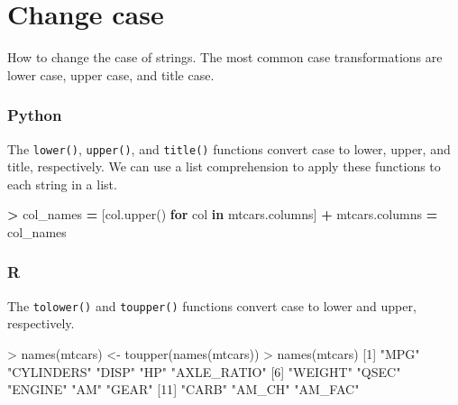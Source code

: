 \documentclass[
]{book}
\newenvironment{Shaded}{\begin{snugshade}}{\end{snugshade}}
\newcommand{\ControlFlowTok}[1]{\textcolor[rgb]{0.13,0.29,0.53}{\textbf{#1}}}
\newcommand{\DecValTok}[1]{\textcolor[rgb]{0.00,0.00,0.81}{#1}}
\newcommand{\FunctionTok}[1]{\textcolor[rgb]{0.00,0.00,0.00}{#1}}
\newcommand{\KeywordTok}[1]{\textcolor[rgb]{0.13,0.29,0.53}{\textbf{#1}}}
\newcommand{\NormalTok}[1]{#1}
\newcommand{\OperatorTok}[1]{\textcolor[rgb]{0.81,0.36,0.00}{\textbf{#1}}}
\newcommand{\OtherTok}[1]{\textcolor[rgb]{0.56,0.35,0.01}{#1}}
\newcommand{\SpecialCharTok}[1]{\textcolor[rgb]{0.00,0.00,0.00}{#1}}
\newcommand{\StringTok}[1]{\textcolor[rgb]{0.31,0.60,0.02}{#1}}
\begin{document}
\hypertarget{change-case}{%
\section{Change case}\label{change-case}}

How to change the case of strings. The most common case transformations are lower case, upper case, and title case.

\hypertarget{python-26}{%
\subsubsection*{Python}\label{python-26}}

The \texttt{lower()}, \texttt{upper()}, and \texttt{title()} functions convert case to lower, upper, and title, respectively. We can use a list comprehension to apply these functions to each string in a list.

\begin{Shaded}
\begin{Highlighting}[]
\OperatorTok{\textgreater{}}\NormalTok{ col\_names }\OperatorTok{=}\NormalTok{ [col.upper() }\ControlFlowTok{for}\NormalTok{ col }\KeywordTok{in}\NormalTok{ mtcars.columns]}
\OperatorTok{+}\NormalTok{ mtcars.columns }\OperatorTok{=}\NormalTok{ col\_names}
\end{Highlighting}
\end{Shaded}

\hypertarget{r-26}{%
\subsubsection*{R}\label{r-26}}

The \texttt{tolower()} and \texttt{toupper()} functions convert case to lower and upper, respectively.

\begin{Shaded}
\begin{Highlighting}[]
\SpecialCharTok{\textgreater{}} \FunctionTok{names}\NormalTok{(mtcars) }\OtherTok{\textless{}{-}} \FunctionTok{toupper}\NormalTok{(}\FunctionTok{names}\NormalTok{(mtcars))}
\SpecialCharTok{\textgreater{}} \FunctionTok{names}\NormalTok{(mtcars)}
\NormalTok{ [}\DecValTok{1}\NormalTok{] }\StringTok{"MPG"}        \StringTok{"CYLINDERS"}  \StringTok{"DISP"}       \StringTok{"HP"}         \StringTok{"AXLE\_RATIO"}
\NormalTok{ [}\DecValTok{6}\NormalTok{] }\StringTok{"WEIGHT"}     \StringTok{"QSEC"}       \StringTok{"ENGINE"}     \StringTok{"AM"}         \StringTok{"GEAR"}      
\NormalTok{[}\DecValTok{11}\NormalTok{] }\StringTok{"CARB"}       \StringTok{"AM\_CH"}      \StringTok{"AM\_FAC"}    
\end{Highlighting}
\end{Shaded}
\end{document}
